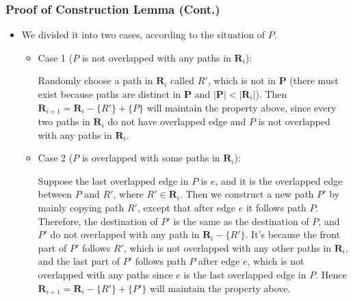 \documentclass[notheorems]{beamer}
\begin{document}
\begin{frame}
\frametitle{Proof of Construction Lemma (Cont.)}
\begin{itemize}
\item We divided it into two cases, according to the situation of $P$.
\pause
\begin{itemize}
\item {\color{red} Case 1} ($P$ is not overlapped with any paths in $\mathbf{R}_i$):

Randomly choose a path in $\mathbf{R}_i$ called $R'$, which is not in $\mathbf{P}$ (there must exist because paths are distinct in $\mathbf{P}$ and $|\mathbf{P}| < |\mathbf{R}_i|$). Then $\mathbf{R}_{i+1} = \mathbf{R}_i - \{R'\} + \{P\}$ will maintain the {\color{blue}property} above, since every two paths in $\mathbf{R}_i$ do not have overlapped edge and $P$ is not overlapped with any paths in $\mathbf{R}_i$.
\pause
\item {\color{red} Case 2} ($P$ is overlapped with some paths in $\mathbf{R}_i$):

Suppose the last overlapped edge in $P$ is $e$, and it is the overlapped edge between $P$ and $R'$, where $R' \in \mathbf{R}_i$. Then we construct a new path $P'$ by mainly copying path $R'$, except that after edge $e$ it follows path $P$. Therefore, the destination of $P'$ is the same as the destination of $P$, and $P'$ do not overlapped with any path in $\mathbf{R}_i - \{R'\}$. It's because the front part of $P'$ follows $R'$, which is not overlapped with any other paths in $\mathbf{R}_i$, and the last part of $P'$ follows path $P$ after edge $e$, which is not overlapped with any paths since $e$ is the last overlapped edge in $P$. Hence $\mathbf{R}_{i+1} = \mathbf{R}_i - \{R'\} + \{P'\}$ will maintain the {\color{blue}property} above.
\end{itemize}
\end{itemize}
\end{frame}
\end{document}
